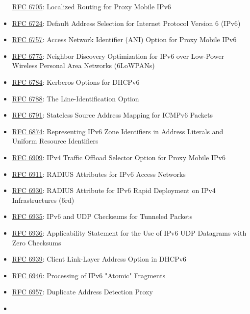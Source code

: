 \documentclass[
]{article}
\begin{document}
\begin{itemize}
  \href{https://www.rfc-editor.org/info/rfc6705}{RFC 6705}: Localized
  Routing for Proxy Mobile IPv6
\item
  \href{https://www.rfc-editor.org/info/rfc6724}{RFC 6724}: Default
  Address Selection for Internet Protocol Version 6 (IPv6)
\item
  \href{https://www.rfc-editor.org/info/rfc6757}{RFC 6757}: Access
  Network Identifier (ANI) Option for Proxy Mobile IPv6
\item
  \href{https://www.rfc-editor.org/info/rfc6775}{RFC 6775}: Neighbor
  Discovery Optimization for IPv6 over Low-Power Wireless Personal Area
  Networks (6LoWPANs)
\item
  \href{https://www.rfc-editor.org/info/rfc6784}{RFC 6784}: Kerberos
  Options for DHCPv6
\item
  \href{https://www.rfc-editor.org/info/rfc6788}{RFC 6788}: The
  Line-Identification Option
\item
  \href{https://www.rfc-editor.org/info/rfc6791}{RFC 6791}: Stateless
  Source Address Mapping for ICMPv6 Packets
\item
  \href{https://www.rfc-editor.org/info/rfc6874}{RFC 6874}: Representing
  IPv6 Zone Identifiers in Address Literals and Uniform Resource
  Identifiers
\item
  \href{https://www.rfc-editor.org/info/rfc6909}{RFC 6909}: IPv4 Traffic
  Offload Selector Option for Proxy Mobile IPv6
\item
  \href{https://www.rfc-editor.org/info/rfc6911}{RFC 6911}: RADIUS
  Attributes for IPv6 Access Networks
\item
  \href{https://www.rfc-editor.org/info/rfc6930}{RFC 6930}: RADIUS
  Attribute for IPv6 Rapid Deployment on IPv4 Infrastructures (6rd)
\item
  \href{https://www.rfc-editor.org/info/rfc6935}{RFC 6935}: IPv6 and UDP
  Checksums for Tunneled Packets
\item
  \href{https://www.rfc-editor.org/info/rfc6936}{RFC 6936}:
  Applicability Statement for the Use of IPv6 UDP Datagrams with Zero
  Checksums
\item
  \href{https://www.rfc-editor.org/info/rfc6939}{RFC 6939}: Client
  Link-Layer Address Option in DHCPv6
\item
  \href{https://www.rfc-editor.org/info/rfc6946}{RFC 6946}: Processing
  of IPv6 "Atomic" Fragments
\item
  \href{https://www.rfc-editor.org/info/rfc6957}{RFC 6957}: Duplicate
  Address Detection Proxy
\item

\end{itemize}
\end{document}
